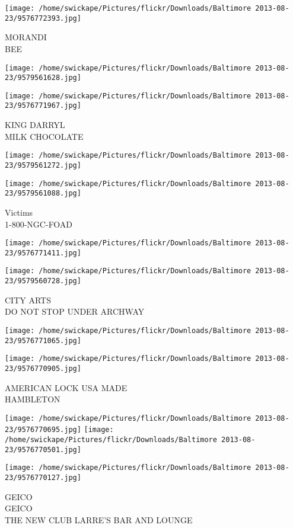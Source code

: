 \documentclass[10pt,letterpaper]{article}
\begin{document}
\vspace{0.25in}
\texttt{[image: /home/swickape/Pictures/flickr/Downloads/Baltimore 2013-08-23/9576772393.jpg]}

MORANDI\\
BEE
\pagebreak

\texttt{[image: /home/swickape/Pictures/flickr/Downloads/Baltimore 2013-08-23/9579561628.jpg]}

\vspace{0.25in}
\texttt{[image: /home/swickape/Pictures/flickr/Downloads/Baltimore 2013-08-23/9576771967.jpg]}

KING DARRYL\\
MILK CHOCOLATE
\pagebreak

\texttt{[image: /home/swickape/Pictures/flickr/Downloads/Baltimore 2013-08-23/9579561272.jpg]}

\vspace{0.25in}
\texttt{[image: /home/swickape/Pictures/flickr/Downloads/Baltimore 2013-08-23/9579561088.jpg]}

Victims\\
1{-}800{-}NGC{-}FOAD
\pagebreak

\texttt{[image: /home/swickape/Pictures/flickr/Downloads/Baltimore 2013-08-23/9576771411.jpg]}

\vspace{0.25in}
\texttt{[image: /home/swickape/Pictures/flickr/Downloads/Baltimore 2013-08-23/9579560728.jpg]}

CITY ARTS\\
DO NOT STOP UNDER ARCHWAY
\pagebreak

\texttt{[image: /home/swickape/Pictures/flickr/Downloads/Baltimore 2013-08-23/9576771065.jpg]}

\vspace{0.25in}
\texttt{[image: /home/swickape/Pictures/flickr/Downloads/Baltimore 2013-08-23/9576770905.jpg]}

AMERICAN LOCK USA MADE\\
HAMBLETON
\pagebreak

\texttt{[image: /home/swickape/Pictures/flickr/Downloads/Baltimore 2013-08-23/9576770695.jpg]}
\texttt{[image: /home/swickape/Pictures/flickr/Downloads/Baltimore 2013-08-23/9576770501.jpg]}

\vspace{0.25in}
\texttt{[image: /home/swickape/Pictures/flickr/Downloads/Baltimore 2013-08-23/9576770127.jpg]}

GEICO\\
GEICO\\
THE NEW CLUB LARRE'S BAR AND LOUNGE
\pagebreak
\end{document}

